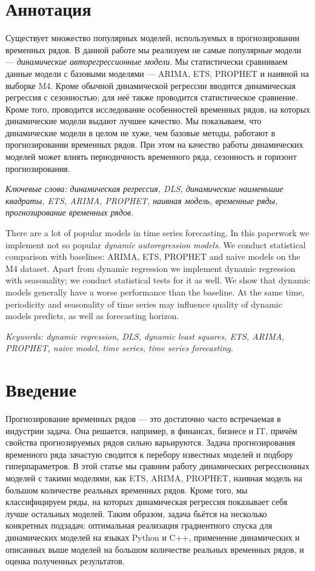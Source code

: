 \documentclass[a4paper,14pt]{extarticle}
\begin{document}
\newpage

{
	\hypersetup{linkcolor=black}
	\tableofcontents
}

\newpage
\section*{Аннотация}
Существует множество популярных моделей, используемых в прогнозировании временных рядов. В данной работе мы реализуем не самые популярные модели --- \textit{динамические авторегрессионные модели}. Мы статистически сравниваем данные модели с базовыми моделями --- ARIMA, ETS, PROPHET и наивной на выборке M4. Кроме обычной динамической регрессии вводится динамическая регрессия с сезонностью; для неё также проводится статистическое сравнение. Кроме того, проводится исследование особенностей временных рядов, на которых динамические модели выдают лучшее качество. Мы показываем, что динамические модели в целом не хуже, чем базовые методы, работают в прогнозировании временных рядов. При этом на качество работы динамических моделей может влиять периодичность временного ряда, сезонность и горизонт прогнозирования.

\textit{Ключевые слова: динамическая регрессия, DLS, динамические наименьшие квадраты, ETS, ARIMA, PROPHET, наивная модель, временные ряды, прогнозирование временных рядов.}

There are a lot of popular models in time series forecasting. In this paperwork we implement not so popular \textit{dynamic autoregression models}. We conduct statistical comparison with baselines: ARIMA, ETS, PROPHET and naive models on the M4 dataset.  Apart from dynamic regression we implement dynamic regression with seasonality; we conduct statistical tests for it as well. We show that dynamic models generally have a worse performance than the baseline. At the same time, periodicity and seasonality of time series may influence quality of dynamic models predicts, as well as forecasting horizon.

\textit{Keywords: dynamic regression, DLS, dynamic least squares, ETS, ARIMA, PROPHET, naive model, time series, time series forecasting.}

\section{Введение}
Прогнозирование временных рядов — это достаточно часто встречаемая в индустрии задача. Она решается, например, в финансах, бизнесе и IT, причём свойства прогнозируемых рядов сильно варьируются. Задача прогнозирования временного ряда зачастую сводится к перебору известных моделей и подбору гиперпараметров. В этой статье мы сравним работу динамических регрессионных моделей с такими моделями, как ETS, ARIMA, PROPHET, наивная модель на большом количестве реальных временных рядов. Кроме того, мы классифицируем ряды, на которых динамическая регрессия показывает себя лучше остальных моделей. Таким образом, задача бьётся на несколько конкретных подзадач: оптимальная реализация градиентного спуска для динамических моделей на языках Python и C++, применение динамических и описанных выше моделей на большом количестве реальных временных рядов, и оценка полученных результатов.
\end{document}
